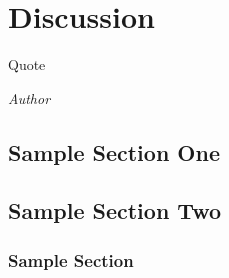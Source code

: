 \documentclass[class=report,11pt,crop=false]{standalone}
\begin{document}
\chapter{Discussion}
\epigraph{Quote}%
    {\emph{Author}}

\section{Sample Section One}

\blindmathpaper

\section{Sample Section Two}

\blindmathpaper

\subsection{Sample Section}

\blindtext












\ifstandalone

\fi
\end{document}
